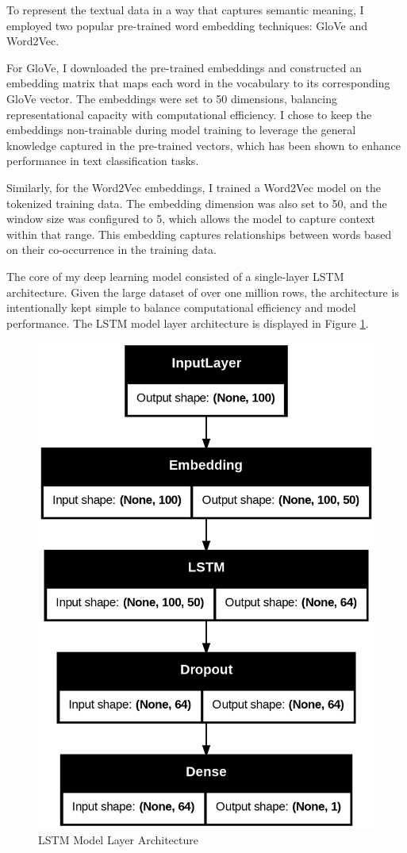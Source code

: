 To represent the textual data in a way that captures semantic meaning, I employed two popular pre-trained word embedding techniques: GloVe and Word2Vec. 

For GloVe, I downloaded the pre-trained embeddings and constructed an embedding matrix that maps each word in the vocabulary to its corresponding GloVe vector. 
The embeddings were set to 50 dimensions, balancing representational capacity with computational efficiency. I chose to keep the embeddings non-trainable during model training to 
leverage the general knowledge captured in the pre-trained vectors, which has been shown to enhance performance in text classification tasks.

Similarly, for the Word2Vec embeddings, I trained a Word2Vec model on the tokenized training data. The embedding dimension was also set to 50, and the window size was configured to 5, 
which allows the model to capture context within that range. This embedding captures relationships between words based on their co-occurrence in the training data.

The core of my deep learning model consisted of a single-layer LSTM architecture.
Given the large dataset of over one million rows, the architecture is intentionally kept simple to balance computational efficiency and model performance. 
The LSTM model layer architecture is displayed in Figure \ref{Fig_3}.

\begin{figure}
    \centering
    \includegraphics[width=0.5\linewidth]{img/model-layers.png}
    \caption{LSTM Model Layer Architecture}
    \label{Fig_3}
\end{figure}

